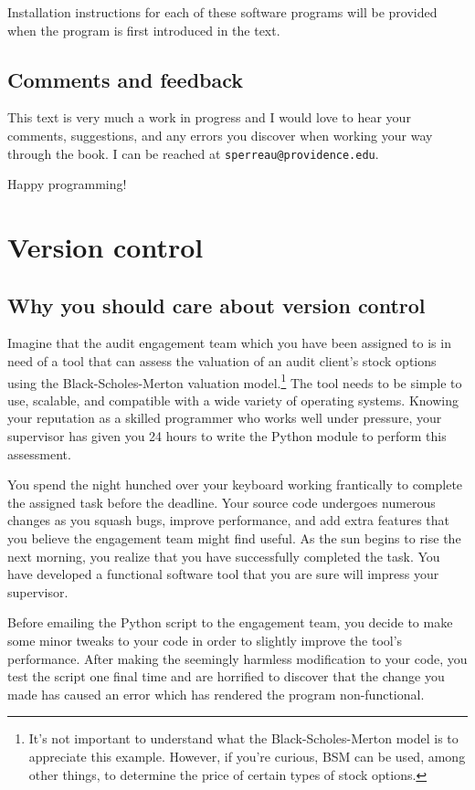\documentclass{book}
\begin{document}
Installation instructions for each of these software programs will be provided when the program is first introduced in the text.

\section{Comments and feedback}

This text is very much a work in progress and I would love to hear your comments, suggestions, and any errors you discover when working your way through the book. I can be reached at \texttt{sperreau@providence.edu}.

Happy programming!


\chapter{Version control}
\section{Why you should care about version control}

Imagine that the audit engagement team which you have been assigned to is in need of a tool that can assess the valuation of an audit client's stock options using the Black-Scholes-Merton valuation model.\footnote{It's not important to understand what the Black-Scholes-Merton model is to appreciate this example. However, if you're curious, BSM can be used, among other things, to determine the price of certain types of stock options.} The tool needs to be simple to use, scalable, and compatible with a wide variety of operating systems. Knowing your reputation as a skilled programmer who works well under pressure, your supervisor has given you 24 hours to write the Python module to perform this assessment.

You spend the night hunched over your keyboard working frantically to complete the assigned task before the deadline. Your source code undergoes numerous changes as you squash bugs, improve performance, and add extra features that you believe the engagement team might find useful. As the sun begins to rise the next morning, you realize that you have successfully completed the task. You have developed a functional software tool that you are sure will impress your supervisor. 

Before emailing the Python script to the engagement team, you decide to make some minor tweaks to your code in order to slightly improve the tool's performance. After making the seemingly harmless modification to your code, you test the script one final time and are horrified to discover that the change you made has caused an error which has rendered the program non-functional.
\end{document}
